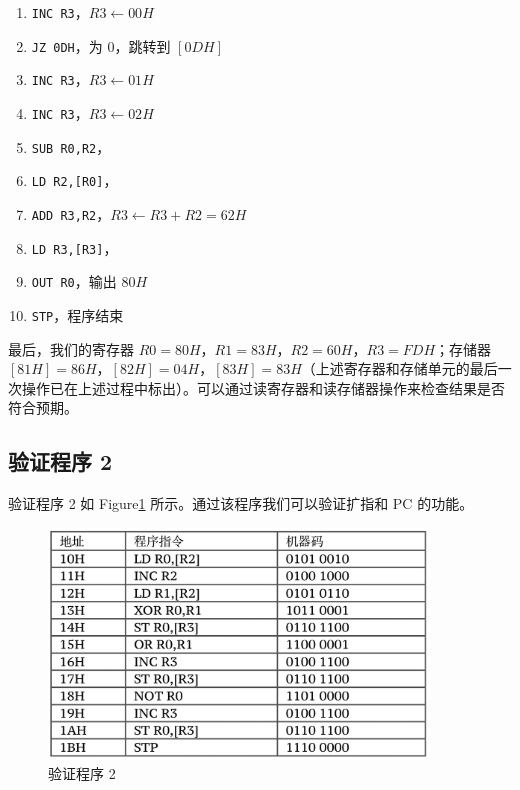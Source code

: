 \documentclass[12pt]{article}
\begin{document}
{\begin{enumerate}
            \item \verb"INC R3"，$R3\gets 00H$
            \item \verb"JZ 0DH"，为 $0$，跳转到 $[0DH]$
            \item \verb"INC R3"，$R3\gets 01H$
            \item \verb"INC R3"，$R3\gets 02H$
            \item \verb"SUB R0,R2"，
            \item \verb"LD R2,[R0]"，
            \item \verb"ADD R3,R2"，$R3\gets R3+R2=62H$
            \item \verb"LD R3,[R3]"，
            \item \verb"OUT R0"，输出 $80H$
            \item \verb"STP"，程序结束
        \end{enumerate}
        
        最后，我们的寄存器 $R0=80H$，$R1=83H$，$R2=60H$，$R3=FDH$；存储器 $[81H]=86H$，$[82H]=04H$，$[83H]=83H$（上述寄存器和存储单元的最后一次操作已在上述过程中标出）。可以通过读寄存器和读存储器操作来检查结果是否符合预期。

    \subsection{验证程序 2}
        验证程序 2 如 Figure\ref{fig:6-2} 所示。通过该程序我们可以验证扩指和 PC 的功能。
        
        \begin{figure}[!ht]
            \centering
            \includegraphics[width=0.9\textwidth]{测试程序2.png}
            \caption{验证程序 2}
            \label{fig:6-2}
        \end{figure}
        
}
\end{document}
